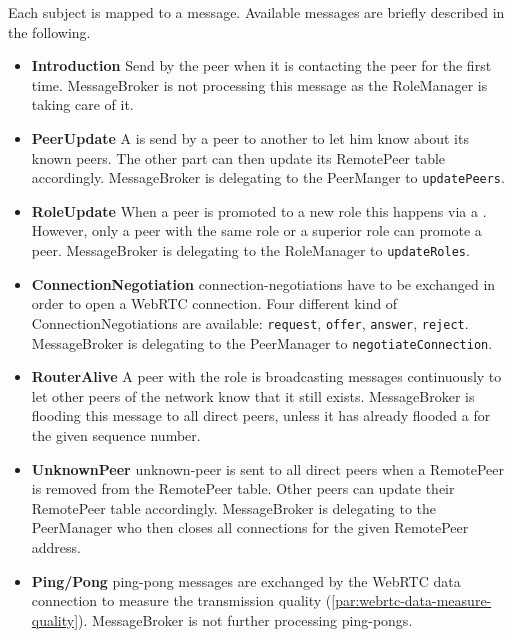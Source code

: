 Each subject is mapped to a message. Available messages are briefly described in the following.
\begin{itemize}
    \item{\textbf{Introduction}\hspace{3mm} \label{itm:mit-msg-introduction}
        Send by the peer when it is contacting the \signal peer for the first time. 
        MessageBroker is not processing this message as the RoleManager is taking care of it.
    }
    \item{\textbf{PeerUpdate}\hspace{3mm}
    \label{itm:mit-msg-PeerUpdate}
        A \peerUpdate is send by a peer to another to let him know about its known peers. The other part can then update its RemotePeer table accordingly.
        MessageBroker is delegating to the PeerManger to \lstinline|updatePeers|.
    }
    \item{\textbf{RoleUpdate}\hspace{3mm}
    \label{itm:mit-msg-RoleUpdate}
        When a peer is promoted to a new role this happens via a \roleUpdate. However, only a peer with the same role or a superior role can promote a peer.
        MessageBroker is delegating to the RoleManager to \lstinline|updateRoles|.
    }
    \item{\textbf{ConnectionNegotiation}\hspace{3mm}
    \label{itm:mit-msg-ConnectionNegotiation}
        \Glspl{connection-negotiation} have to be exchanged in order to open a WebRTC connection. Four different kind of ConnectionNegotiations are available: \lstinline|request|, \lstinline|offer|, \lstinline|answer|, \lstinline|reject|.
        MessageBroker is delegating to the PeerManager to \lstinline|negotiateConnection|.
    }
    \item{\textbf{RouterAlive}\hspace{3mm}
    \label{itm:mit-msg-RouterAlive}
        A peer with the role \routerRole is broadcasting \routerAlive messages continuously to let other peers of the network know that it still exists.
        MessageBroker is flooding this message to all direct peers, unless it has already flooded a \routerAlive for the given sequence number.
    }
    \item{\textbf{UnknownPeer}\hspace{3mm}
    \label{itm:mit-msg-UnknownPeer}
        \Gls{unknown-peer} is sent to all direct peers when a RemotePeer is removed from the RemotePeer table. Other peers can update their RemotePeer table accordingly.
        MessageBroker is delegating to the PeerManager who then closes all connections for the given RemotePeer address.
    }
    \item{\textbf{Ping/Pong}\hspace{3mm}
    \label{itm:mit-msg-PingPong}
        \Gls{ping-pong} messages are exchanged by the WebRTC data connection to measure the transmission quality (\vref{par:webrtc-data-measure-quality}).
        MessageBroker is not further processing \glspl{ping-pong}.
    }
\end{itemize}